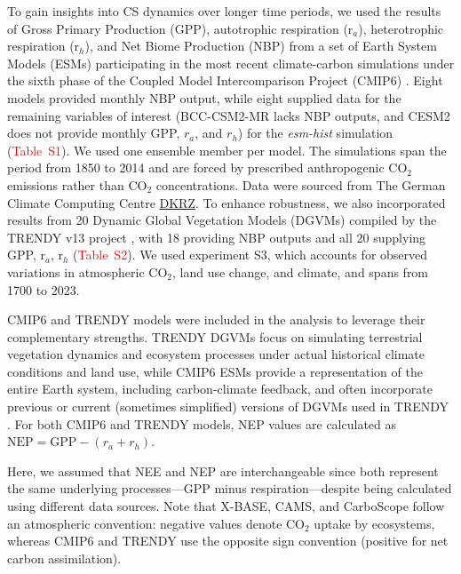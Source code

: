 \documentclass[ProofPDF]{./Styles/Jnls-Template-V3}
\begin{document}
To gain insights into CS dynamics over longer time periods, we used the results of Gross Primary Production (GPP), autotrophic respiration (r$_a$), heterotrophic respiration (r$_h$), and Net Biome Production (NBP) from a set of Earth System Models (ESMs) participating in the most recent climate-carbon simulations under the sixth phase of the Coupled Model Intercomparison Project (CMIP6) \citep{Eyring2016}. Eight models provided monthly NBP output, while eight supplied data for the remaining variables of interest (BCC-CSM2-MR lacks NBP outputs, and CESM2 does not provide monthly GPP, $r_a$, and $r_h$) for the \emph{esm-hist} simulation (\textcolor{red}{Table~S1}). We used one ensemble member per model. The simulations span the period from 1850 to 2014 and are forced by prescribed anthropogenic CO$_2$ emissions rather than CO$_2$ concentrations. Data were sourced from The German Climate Computing Centre \hyperlink{https://cmip-data-pool.dkrz.de/CMIP6-Data-Pool.html}{DKRZ}. To enhance robustness, we also incorporated results from 20 Dynamic Global Vegetation Models (DGVMs) compiled by the TRENDY v13 project \citep{Sitch2024}, with 18 providing NBP outputs and all 20 supplying GPP, r$_a$, r$_h$ (\textcolor{red}{Table~S2}). We used experiment S3, which accounts for observed variations in atmospheric CO$_2$, land use change, and climate, and spans from 1700 to 2023. 


CMIP6 and TRENDY models were included in the analysis to leverage their complementary strengths. TRENDY DGVMs focus on simulating terrestrial vegetation dynamics and ecosystem processes under actual historical climate conditions and land use, while CMIP6 ESMs provide a representation of the entire Earth system, including carbon-climate feedback, and often incorporate previous or current (sometimes simplified) versions of DGVMs used in TRENDY \citep{Argles2022,Weng2022}. For both CMIP6 and TRENDY models, NEP values are calculated as $\mathrm{NEP}=\mathrm{GPP}-(r_a+r_h)$.

Here, we assumed that NEE and NEP are interchangeable since both represent the same underlying processes—GPP minus respiration—despite being calculated using different data sources. Note that X-BASE, CAMS, and CarboScope follow an atmospheric convention: negative values denote CO$_2$ uptake by ecosystems, whereas CMIP6 and TRENDY use the opposite sign convention (positive for net carbon assimilation).
\end{document}
